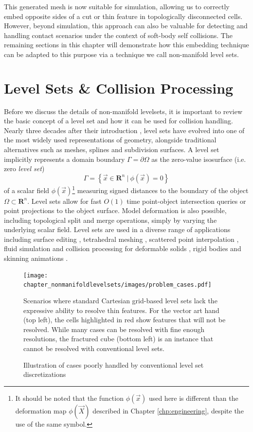 This generated mesh is now suitable for simulation, allowing us to
correctly embed opposite sides of a cut or thin feature in
topologically disconnected cells. However, beyond simulation, this
approach can also be valuable for detecting and handling contact
scenarios under the context of soft-body self collisions. The
remaining sections in this chapter will demonstrate how this embedding
technique can be adapted to this purpose via a technique we call
non-manifold level sets.

\section{Level Sets \& Collision Processing}
Before we discuss the details of non-manifold levelsets, it is
important to review the basic concept of a level set and how it can be
used for collision handling. Nearly three decades after their
introduction \citep{OsherS:1988}, level sets have evolved into one of
the most widely used representations of geometry, alongside
traditional alternatives such as meshes, splines and subdivision
surfaces. A level set implicitly represents a domain boundary
$\Gamma=\partial\Omega$ as the zero-value isosurface (i.e. zero
\emph{level set})
\begin{equation}
\Gamma=\left\{\vec{x}\in\mathbf{R}^n\ |\ \phi(\vec{x})=0\right\}
\label{eqn:definition}
\end{equation}
of a scalar field $\phi(\vec{x})$\footnote{It should be noted that the
function $\phi(\vec{x})$ used here is different than the deformation
map $\phi(\vec{X})$ described in Chapter \ref{chp:engineering},
despite the use of the same symbol.} measuring signed distances to the
boundary of the object $\Omega\subset\mathbf{R}^n$. Level sets allow
for fast $O(1)$ time point-object intersection queries or point
projections to the object surface. Model deformation is also possible,
including topological split and merge operations, simply by varying
the underlying scalar field. Level sets are used in a diverse range of
applications including surface editing \citep{MusetBWB:2002},
tetrahedral meshing \citep{LabelS:2007}, scattered point interpolation
\citep{ZhaoOF:2001}, fluid simulation \citep{OsherF:2002} and collision
processing for deformable solids \citep{Gascu:1993}, rigid bodies
\citep{GuendBF:2003} and skinning animations \citep{VaillBGCRWGP:2013}.


\begin{figure}
  \centering
\texttt{[image: chapter\_nonmanifoldlevelsets/images/problem\_cases.pdf]}
\vspace*{-.15in}
\caption{Illustration of cases poorly handled by conventional level
  set discretizations} {Scenarios where standard Cartesian grid-based
  level sets lack the expressive ability to resolve thin features. For
  the vector art hand (top left), the cells highlighted in red show
  features that will not be resolved. While many cases can be resolved
  with fine enough resolutions, the fractured cube (bottom left) is an
  instance that cannot be resolved with conventional level sets.}
\label{fig:underresolved}
\vspace*{-.2in}
\end{figure}


